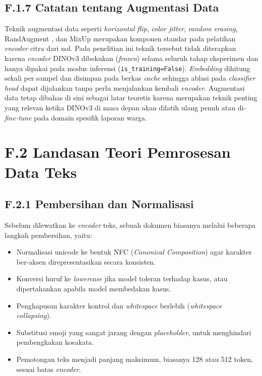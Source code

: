 \subsection*{F.1.7 Catatan tentang Augmentasi Data}

Teknik augmentasi data seperti \textit{horizontal flip}, \textit{color jitter}, \textit{random erasing}, RandAugment \citep{cubukRandAugment2020}, dan MixUp \citep{zhangMixup2018} merupakan komponen standar pada pelatihan \textit{encoder} citra dari nol. Pada penelitian ini teknik tersebut tidak diterapkan karena \textit{encoder} DINOv3 dibekukan (\textit{frozen}) selama seluruh tahap eksperimen dan hanya dipakai pada modus inferensi (\texttt{is\_training=False}). \textit{Embedding} dihitung sekali per sampel dan disimpan pada berkas \textit{cache} sehingga ablasi pada \textit{classifier head} dapat dijalankan tanpa perlu menjalankan kembali \textit{encoder}. Augmentasi data tetap dibahas di sini sebagai latar teoretis karena merupakan teknik penting yang relevan ketika DINOv3 di masa depan akan dilatih ulang penuh atau di-\textit{fine-tune} pada domain spesifik laporan warga.

\section*{F.2 Landasan Teori Pemrosesan Data Teks}
\label{app:textproc-detail}

\subsection*{F.2.1 Pembersihan dan Normalisasi}

Sebelum dilewatkan ke \textit{encoder} teks, sebuah dokumen biasanya melalui beberapa langkah pembersihan, yaitu:

\begin{itemize}
    \item Normalisasi unicode ke bentuk NFC (\textit{Canonical Composition}) agar karakter ber-aksen direpresentasikan secara konsisten.
    \item Konversi huruf ke \textit{lowercase} jika model toleran terhadap kasus, atau dipertahankan apabila model membedakan kasus.
    \item Penghapusan karakter kontrol dan \textit{whitespace} berlebih (\textit{whitespace collapsing}).
    \item Substitusi emoji yang sangat jarang dengan \textit{placeholder}, untuk menghindari pembengkakan kosakata.
    \item Pemotongan teks menjadi panjang maksimum, biasanya 128 atau 512 token, sesuai batas \textit{encoder}.
\end{itemize}

